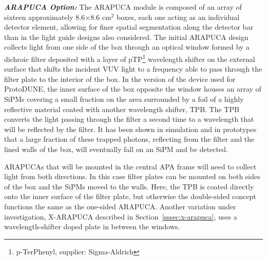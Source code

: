 

{\it\bf ARAPUCA Option:} The ARAPUCA module is composed of an array of sixteen approximately 8.6$\times$8.6 cm$^2$ boxes, 
 each one acting as an individual detector element, allowing for finer spatial segmentation along the detector bar than in the light guide designs also considered. 
The initial ARAPUCA design collects light from one side of the box through an optical window formed  
by a dichroic filter deposited with a layer of pTP\footnote{p-TerPhenyl,  supplier: Sigma-Aldrich\textregistered}
wavelength shifter on the external surface that shifts the incident VUV light to a frequency able to pass through the filter plate to the interior of the box.  
In the version of the device used for ProtoDUNE, the inner surface of the box opposite the window houses an array of SiPMs covering a small fraction on the area surrounded by a foil of a highly reflective material coated with another wavelength shifter, TPB. The TPB
converts the light passing through the filter a second time to a wavelength that will be reflected by the filter. It has been shown in simulation and in prototypes that a large fraction of these trapped photons, reflecting from the filter and the lined walls of the box, will eventually fall on an SiPM and be detected.

ARAPUCAs that will be mounted in the central APA frame will need to collect light from both directions. In this case filter plates can be mounted on both sides of the box and the SiPMs moved to the walls.  Here, the TPB is coated directly onto the inner surface of the filter plate, but otherwise the double-sided concept functions the same as the one-sided ARAPUCA. 
Another variation under investigation, X-ARAPUCA described in Section~\ref{sssec:x-arapuca}, uses a wavelength-shifter doped plate in between the windows.

